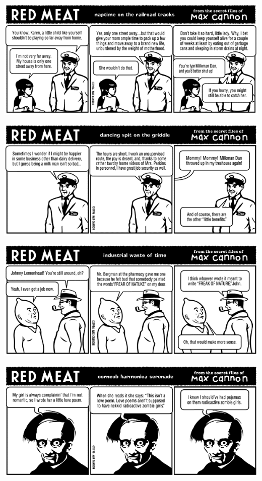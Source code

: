 \documentclass[a4paper,twoside,11pt]{article}
\begin{document}
\includegraphics[width=\textwidth]{redmeat_1996-11-25.png}



\includegraphics[width=\textwidth]{redmeat_1996-12-02.png}



\includegraphics[width=\textwidth]{redmeat_1996-12-09.png}



\includegraphics[width=\textwidth]{redmeat_1996-12-16.png}
\end{document}

